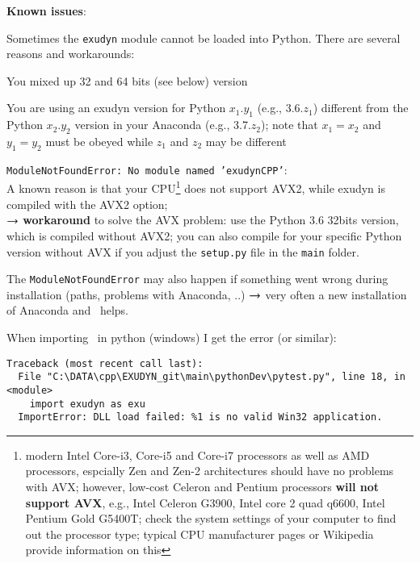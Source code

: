 {\bf Known issues}:
\bn
  \item Sometimes the \texttt{exudyn} module cannot be loaded into Python. There are several reasons and workarounds:
	\bi
	  \item You mixed up 32 and 64 bits (see below) version
		\item You are using an exudyn version for Python $x_1.y_1$ (e.g., 3.6.$z_1$) different from the Python $x_2.y_2$ version in your Anaconda (e.g., 3.7.$z_2$); note that $x_1=x_2$ and $y_1=y_2$ must be obeyed while $z_1$ and $z_2$ may be different
		\item \texttt{ModuleNotFoundError: No module named 'exudynCPP'}:\\
		A known reason is that your CPU\footnote{modern Intel Core-i3, Core-i5 and Core-i7 processors as well as AMD processors, espcially Zen and Zen-2 architectures should have no problems with AVX; however, low-cost Celeron and Pentium processors {\bf will not support AVX}, e.g.,  Intel Celeron G3900, Intel core 2 quad q6600, Intel Pentium Gold G5400T; check the system settings of your computer to find out the processor type; typical CPU manufacturer pages or Wikipedia provide information on this} does not support AVX2, while exudyn is compiled with the AVX2 option; \\
		$\rightarrow$ {\bf workaround} to solve the AVX problem: use the Python 3.6 32bits version, which is compiled without AVX2; you can also compile for your specific Python version without AVX if you adjust the \texttt{setup.py} file in the \texttt{main} folder.
	  \item[] The \texttt{ModuleNotFoundError} may also happen if something went wrong during installation (paths, problems with Anaconda, ..) $\rightarrow$ very often a new installation of Anaconda and \codeName\ helps.
	\ei
  \item When importing \codeName\ in python (windows) I get the error (or similar):\\
{\ttfamily \footnotesize
\begin{lstlisting}[breaklines=true]
Traceback (most recent call last):
  File "C:\DATA\cpp\EXUDYN_git\main\pythonDev\pytest.py", line 18, in <module>
    import exudyn as exu
  ImportError: DLL load failed: %1 is no valid Win32 application.
\end{lstlisting}}
